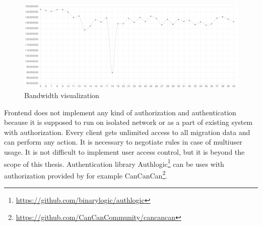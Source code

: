\begin{figure}[htb]
	\begin{center}
	\includegraphics[width=\textwidth]{themis-graph-bw-1457.png}
	\end{center}
	\caption{Bandwidth visualization}
	\label{img:themis-graph}
\end{figure}

Frontend does not implement any kind of authorization and authentication because it is supposed to run on isolated network or as a part of existing system with authorization. Every client gets unlimited access to all migration data and can perform any action. It is necessary to negotiate rules in case of multiuser usage. It is not difficult to implement user access control, but it is beyond the scope of this thesis. Authentication library Authlogic\footnote{\url{https://github.com/binarylogic/authlogic}} can be uses with authorization provided by for example CanCanCan\footnote{\url{https://github.com/CanCanCommunity/cancancan}}.
